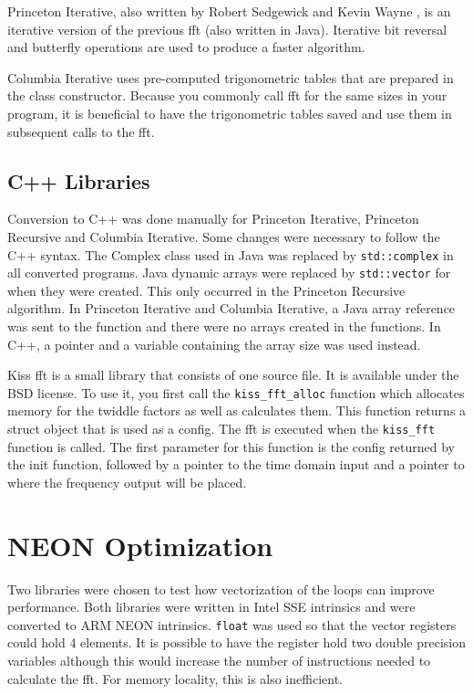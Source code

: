 Princeton Iterative, also written by Robert Sedgewick and Kevin Wayne \cite{princeton:iterative}, is an iterative version of the previous \gls{fft} (also written in Java). Iterative bit reversal and butterfly operations are used to produce a faster algorithm.

Columbia Iterative \cite{columbia:iterative} uses pre-computed trigonometric tables that are prepared in the class constructor. Because you commonly call \gls{fft} for the same sizes in your program, it is beneficial to have the trigonometric tables saved and use them in subsequent calls to the \gls{fft}.

\subsection{C++ Libraries}
Conversion to C++ was done manually for Princeton Iterative, Princeton Recursive and Columbia Iterative. Some changes were necessary to follow the C++ syntax. The Complex class used in Java was replaced by \texttt{std::complex} in all converted programs. Java dynamic arrays were replaced by \texttt{std::vector} for when they were created. This only occurred in the Princeton Recursive algorithm. In Princeton Iterative and Columbia Iterative, a Java array reference was sent to the function and there were no arrays created in the functions. In C++, a pointer and a variable containing the array size was used instead.

Kiss \gls{fft} is a small library that consists of one source file. It is available under the BSD license. To use it, you first call the \texttt{kiss\_fft\_alloc} function which allocates memory for the twiddle factors as well as calculates them. This function returns a struct object that is used as a config. The \gls{fft} is executed when the \texttt{kiss\_fft} function is called. The first parameter for this function is the config returned by the init function, followed by a pointer to the time domain input and a pointer to where the frequency output will be placed.

\section{NEON Optimization}

Two libraries were chosen to test how vectorization of the loops can improve performance. Both libraries were written in Intel SSE intrinsics and were converted to ARM NEON intrinsics. \texttt{float} was used so that the vector registers could hold 4 elements. It is possible to have the register hold two double precision variables although this would increase the number of instructions needed to calculate the \gls{fft}. For memory locality, this is also inefficient.

